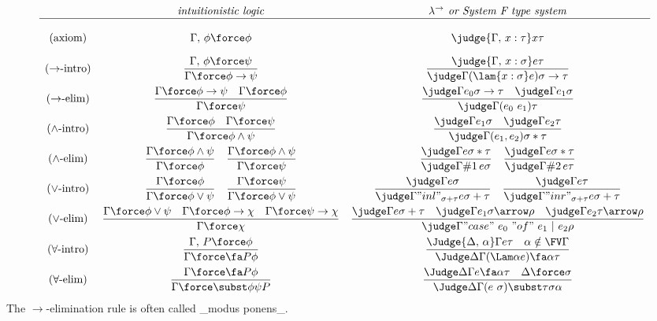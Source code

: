 \[
\begin{array}{ccc}
& \mbox{\textit{intuitionistic logic}} & \mbox{\textit{$\lambda^\to$ or System F type system}}\\ \hline\\
\mbox{(axiom)} & \Gamma,\,\phi\force\phi & \judge{\Gamma,\,x:\tau}x\tau\\[1em]
\mbox{($\to$-intro)}
& \dfrac{\Gamma,\,\phi\force\psi}{\Gamma\force\phi\to\psi}
& \dfrac{\judge{\Gamma,\,x:\sigma}e\tau}{\judge\Gamma{(\lam{x:\sigma}e)}{\sigma\to\tau}}\\[1em]
\mbox{($\to$-elim)}
& \dfrac{\Gamma\force\phi\to\psi \quad \Gamma\force\phi}{\Gamma\force\psi}
& \dfrac{\judge\Gamma{e_0}{\sigma\to\tau} \quad \judge\Gamma{e_1}\sigma}{\judge\Gamma{(e_0~e_1)}\tau}\\[1em]
\mbox{($\wedge$-intro)}
& \dfrac{\Gamma\force\phi\quad\Gamma\force\psi}{\Gamma\force\phi\wedge\psi}
& \dfrac{\judge\Gamma{e_1}\sigma\quad\judge\Gamma{e_2}\tau}{\judge\Gamma{(e_1,e_2)}{\sigma*\tau}}\\[1em]
\mbox{($\wedge$-elim)}
& \dfrac{\Gamma\force\phi\wedge\psi}{\Gamma\force\phi}\quad\dfrac{\Gamma\force\phi\wedge\psi}{\Gamma\force\psi}
& \dfrac{\judge\Gamma e{\sigma*\tau}}{\judge\Gamma{\#1\,e}\sigma}\quad\dfrac{\judge\Gamma e{\sigma*\tau}}{\judge\Gamma{\#2\,e}\tau}\\[1em]
\mbox{($\vee$-intro)}
& \dfrac{\Gamma\force\phi}{\Gamma\force\phi\vee\psi} \quad \dfrac{\Gamma\force\psi}{\Gamma\force\phi\vee\psi}
& \dfrac{\judge\Gamma e\sigma}{\judge\Gamma{"inl"_{\sigma+\tau}}e{\sigma+\tau}} \quad \dfrac{\judge\Gamma e\tau}{\judge\Gamma{"inr"_{\sigma+\tau}}e{\sigma+\tau}}\\[1em]
\mbox{($\vee$-elim)}
& \dfrac{\Gamma\force\phi\vee\psi\quad\Gamma\force\phi\to\chi\quad\Gamma\force\psi\to\chi}{\Gamma\force\chi}
& \dfrac{\judge\Gamma e{\sigma+\tau} \quad \judge\Gamma{e_1}{\sigma\arrow\rho} \quad \judge\Gamma{e_2}{\tau\arrow\rho}}{\judge\Gamma{"case"~e_0~"of"~e_1~|~e_2}\rho}\\[1em]
\mbox{($\forall$-intro)}
& \dfrac{\Gamma,\,P\force\phi}{\Gamma\force\fa P\phi}
& \dfrac
{\Judge{\Delta,\,\alpha}\Gamma e\tau \quad \alpha\notin\FV\Gamma}
{\Judge\Delta\Gamma{(\Lam\alpha e)}{\fa\alpha\tau}}\\[1em]
\mbox{($\forall$-elim)}
& \dfrac{\Gamma\force\fa P\phi}{\Gamma\force\subst\phi\psi P}
& \dfrac
{\Judge\Delta\Gamma e{\fa\alpha\tau} \quad \Delta\force\sigma}
{\Judge\Delta\Gamma{(e~\sigma)}{\subst\tau\sigma\alpha}}
\end{array}
\]
The $\to$-elimination rule is often called _modus ponens_.

